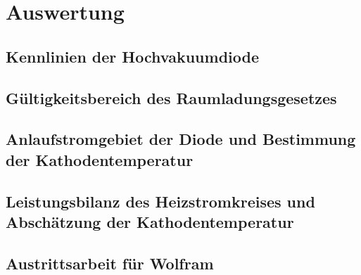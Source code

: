 \section{Auswertung}
\label{sec:Auswertung}

\subsection{Kennlinien der Hochvakuumdiode}

\subsection{Gültigkeitsbereich des Raumladungsgesetzes}

\subsection{Anlaufstromgebiet der Diode und Bestimmung der Kathodentemperatur}

\subsection{Leistungsbilanz des Heizstromkreises und Abschätzung der Kathodentemperatur}

\subsection{Austrittsarbeit für Wolfram}